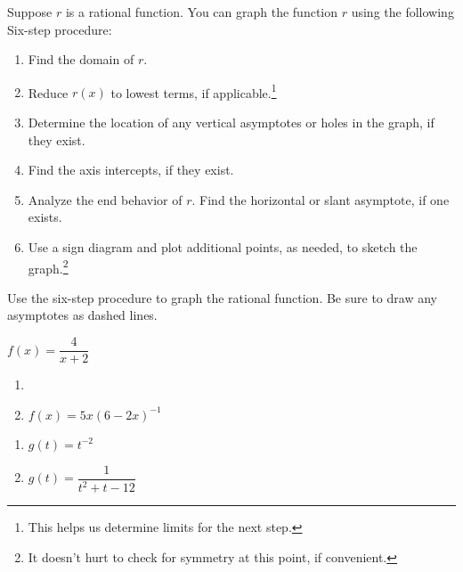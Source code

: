 \documentclass{ximera}
\begin{document}
	\author{Stitz-Zeager}


Suppose $r$ is a rational function.  You can graph the function $r$ using the following Six-step procedure:

\begin{enumerate}

\item  Find the domain of $r$.

\item  Reduce $r(x)$ to lowest terms, if applicable.\footnote{This helps us determine limits for the next step.}

\item  Determine the location of any vertical asymptotes or holes in the graph, if they exist. 

\item  Find the axis intercepts, if they exist.

\item  Analyze the end behavior of $r$.  Find the horizontal or slant asymptote, if one exists.

\item  Use a sign diagram and plot additional points, as needed, to sketch the graph.\footnote{It doesn't hurt to check for symmetry at this point, if convenient.}

\end{enumerate}

\begin{problem}\label{sixstepfirst}
Use the six-step procedure
to graph the rational function.  Be sure to draw any asymptotes as dashed lines.

$f(x) = \dfrac{4}{x + 2}$
\end{problem}


\begin{enumerate}

\item  
\item $f(x) = 5x(6-2x)^{-1}$  

\setcounter{HW}{\value{enumi}}
\end{enumerate}

\begin{enumerate}
\setcounter{enumi}{\value{HW}}

\item $g(t) = t^{-2}$ 
\item $g(t) = \dfrac{1}{t^{2} + t - 12}$

\setcounter{HW}{\value{enumi}}
\end{enumerate}
\end{document}

